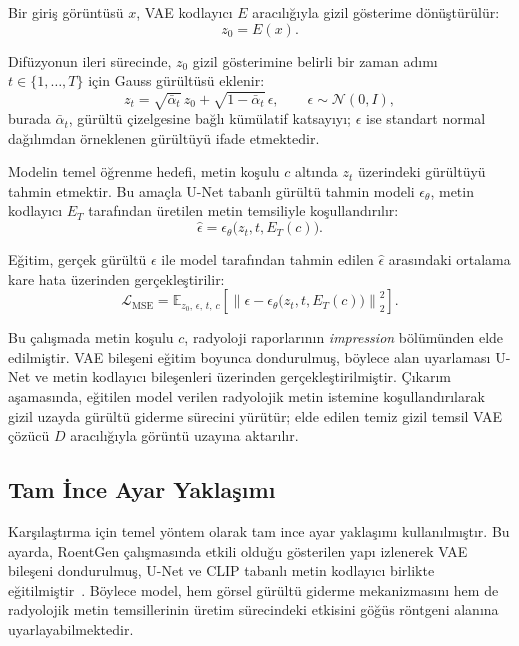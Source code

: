 \documentclass[11pt]{article}
\begin{document}
Bir giriş görüntüsü $x$, VAE kodlayıcı $E$ aracılığıyla gizil gösterime
dönüştürülür:
\begin{equation}
z_0 = E(x).
\label{eq:latent_encoding}
\end{equation}

Difüzyonun ileri sürecinde, $z_0$ gizil gösterimine belirli bir zaman adımı
$t \in \{1,\dots,T\}$ için Gauss gürültüsü eklenir:
\begin{equation}
z_t=\sqrt{\bar\alpha_t}\,z_0+\sqrt{1-\bar\alpha_t}\,\epsilon,
\qquad \epsilon\sim\mathcal{N}(0,I),
\label{eq:forward}
\end{equation}
burada $\bar\alpha_t$, gürültü çizelgesine bağlı kümülatif katsayıyı; $\epsilon$
ise standart normal dağılımdan örneklenen gürültüyü ifade etmektedir.

Modelin temel öğrenme hedefi, metin koşulu $c$ altında $z_t$ üzerindeki
gürültüyü tahmin etmektir. Bu amaçla U-Net tabanlı gürültü tahmin modeli
$\epsilon_\theta$, metin kodlayıcı $E_T$ tarafından üretilen metin temsiliyle
koşullandırılır:
\begin{equation}
\hat{\epsilon} = \epsilon_\theta\big(z_t, t, E_T(c)\big).
\label{eq:noise_prediction}
\end{equation}

Eğitim, gerçek gürültü $\epsilon$ ile model tarafından tahmin edilen
$\hat{\epsilon}$ arasındaki ortalama kare hata üzerinden gerçekleştirilir:
\begin{equation}
\mathcal{L}_{\text{MSE}}=
\mathbb{E}_{z_0,\,\epsilon,\,t,\,c}
\left[
\left\|
\epsilon-\epsilon_\theta\big(z_t,t,E_T(c)\big)
\right\|_2^2
\right].
\label{eq:mse}
\end{equation}

Bu çalışmada metin koşulu $c$, radyoloji raporlarının \emph{impression}
bölümünden elde edilmiştir. VAE bileşeni eğitim boyunca dondurulmuş, böylece
alan uyarlaması U-Net ve metin kodlayıcı bileşenleri üzerinden
gerçekleştirilmiştir. Çıkarım aşamasında, eğitilen model verilen radyolojik
metin istemine koşullandırılarak gizil uzayda gürültü giderme sürecini yürütür;
elde edilen temiz gizil temsil VAE çözücü $D$ aracılığıyla görüntü uzayına
aktarılır.

\subsection{Tam İnce Ayar Yaklaşımı}

Karşılaştırma için temel yöntem olarak tam ince ayar yaklaşımı kullanılmıştır.
Bu ayarda, RoentGen çalışmasında etkili olduğu gösterilen yapı izlenerek VAE
bileşeni dondurulmuş, U-Net ve CLIP tabanlı metin kodlayıcı birlikte
eğitilmiştir~\cite{roentgen}. Böylece model, hem görsel gürültü giderme
mekanizmasını hem de radyolojik metin temsillerinin üretim sürecindeki etkisini
göğüs röntgeni alanına uyarlayabilmektedir.
\end{document}
